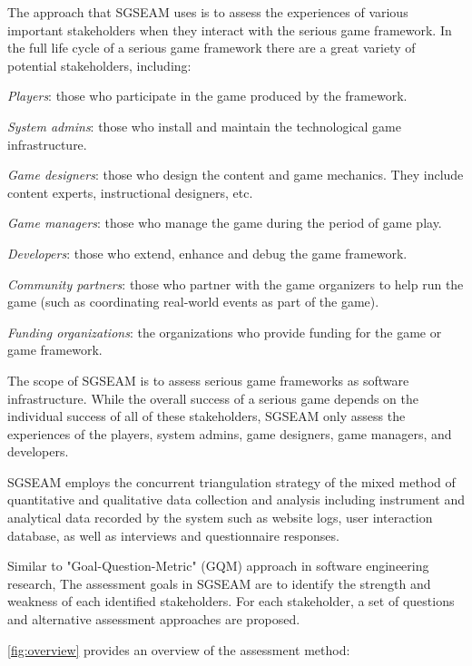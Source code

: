 \documentclass{sigchi}
\begin{document}
The approach that SGSEAM uses is to assess the experiences of various important stakeholders when
they interact with the serious game framework. In the full life cycle of a serious game framework
there are a great variety of potential stakeholders, including:

\begin{compactitem}
\item \emph{Players}: those who participate in the game produced by the framework.
\item \emph{System admins}: those who install and maintain the technological game infrastructure.
\item \emph{Game designers}: those who design the content and game mechanics. They include  content experts, instructional designers, etc.
\item \emph{Game managers}: those who manage the game during the period of game play.
\item \emph{Developers}: those who extend, enhance and debug the game framework.
\item \emph{Community partners}: those who partner with the game
  organizers to help run the game (such as coordinating real-world
  events as part of the game).
\item \emph{Funding organizations}: the organizations who provide
  funding for the game or game framework.
\end{compactitem}

The scope of SGSEAM is to assess serious game frameworks as software infrastructure. While
the overall success of a serious game depends on the individual success of all of these
stakeholders, SGSEAM only assess the experiences of the players, system admins, game designers, game managers, and developers.

SGSEAM employs the concurrent triangulation strategy \cite{creswell2003} of the mixed method of quantitative and qualitative data collection and analysis including instrument and
analytical data recorded by the system such as website logs, user interaction database, as well
as interviews and questionnaire responses.

Similar to "Goal-Question-Metric" (GQM) approach \cite{caldiera1994goal} in
software engineering research, The assessment goals in SGSEAM are to identify the strength and weakness of each identified stakeholders. For each
stakeholder, a set of questions and alternative assessment approaches are
proposed. 

\autoref{fig:overview} provides an overview of the assessment method:
\end{document}

